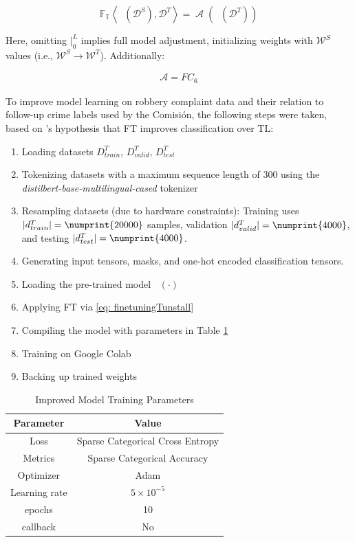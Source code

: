 \documentclass[onecolumn, journal, english, 12pt, a4paper]{IEEEtran} %
\DeclareMathOperator{\ypredsource}{\phi^{S}}
\DeclareMathOperator{\ConvNetOut}{\mathcal{A}}
\theoremstyle{definition}
\begin{document}
\begin{equation}\label{eq: finetuningTunstall}
    \mathbb{F_{T}} \left< \ypredsource(\mathcal{D}^{S}), \mathcal{D}^{T} \right> = \ConvNetOut \left(\ypredsource(\mathcal{D}^{T})\right)
\end{equation}

Here, omitting $\Bigr\rvert_{0}^{L}$ implies full model adjustment,
initializing weights with $\mathcal{W}^S$ values (i.e.,
$\mathcal{W}^S\rightarrow \mathcal{W}^T$). Additionally:

\begin{align}\label{eq:finetuningOut}
    \mathcal{A} = FC_{6}
\end{align}


To improve model learning on robbery complaint data and their relation
to follow-up crime labels used by the Comisión, the following steps
were taken, based on \textcite{tunstall2022natural}'s hypothesis that
FT improves classification over TL:

\begin{enumerate}
    \item Loading datasets $D^T_{train}$, $D^T_{valid}$, $D^T_{test}$
    \item Tokenizing datasets with a maximum sequence length of 300 using the \emph{distilbert-base-multilingual-cased} tokenizer
    \item Resampling datasets (due to hardware constraints): Training uses $|d_{train}^T| = \numprint{20000}$ samples, validation $|d_{valid}^T| = \numprint{4000}$, and testing $|d_{test}^T| = \numprint{4000}$.
    \item Generating input tensors, masks, and one-hot encoded classification tensors.
    \item Loading the pre-trained model $\ypredsource(\cdot)$
    \item Applying FT via \eqref{eq: finetuningTunstall}
    \item Compiling the model with parameters in Table \ref{tab:trainingParam2}
    \item Training on Google Colab
    \item Backing up trained weights
\end{enumerate}

\begin{table}
    \caption{Improved Model Training Parameters}
    \label{tab:trainingParam2}
    \centering
    \begin{tabular}{cc}
    \hline
    Parameter & Value\\
    \hline
     Loss & Sparse Categorical Cross Entropy\\
    Metrics & Sparse Categorical Accuracy \\
    Optimizer & Adam \\
    Learning rate & $5 \times 10^{-5}$ \\
    epochs & 10 \\
    callback & No \\
    \hline
    \end{tabular}
  \end{table}
\end{document}

